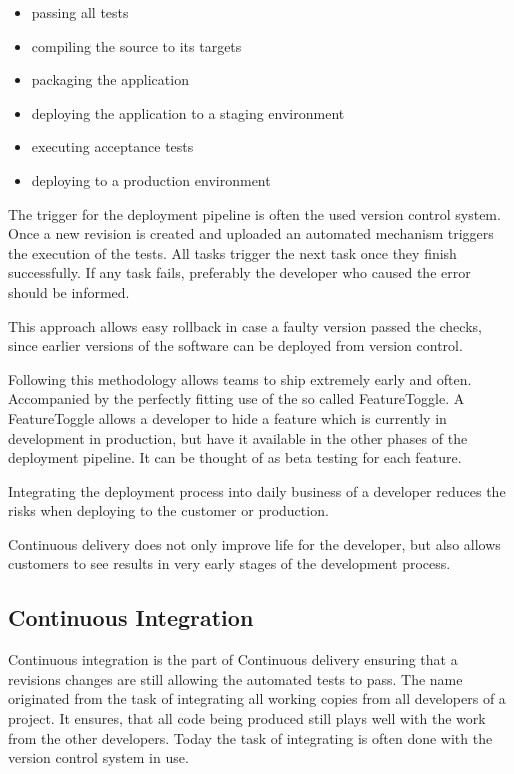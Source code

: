 \begin{itemize}
  \item{passing all tests}
  \item{compiling the source to its targets}
  \item{packaging the application}
  \item{deploying the application to a staging environment}
  \item{executing acceptance tests}
  \item{deploying to a production environment}
\end{itemize}

The trigger for the deployment pipeline is often the used version control
system. Once a new revision is created and uploaded an automated mechanism
triggers the execution of the tests. All tasks trigger the next task once they
finish successfully. If any task fails, preferably the developer who caused the
error should be informed.

This approach allows easy rollback in case a faulty version passed the checks,
since earlier versions of the software can be deployed from version control.

Following this methodology allows teams to ship extremely early and often.
Accompanied by the perfectly fitting use of the so called FeatureToggle. A
FeatureToggle allows a developer to hide a feature which is currently in
development in production, but have it available in the other phases of the
deployment pipeline. It can be thought of as beta testing for each feature.

Integrating the deployment process into daily business of a developer reduces
the risks when deploying to the customer or production.

Continuous delivery does not only improve life for the developer, but also
allows customers to see results in very early stages of the development
process.

\subsection{Continuous Integration}

Continuous integration is the part of Continuous delivery ensuring that a
revisions changes are still allowing the automated tests to pass. The name
originated from the task of integrating all working copies from all developers
of a project. It ensures, that all code being produced still plays well with
the work from the other developers. Today the task of integrating is often done
with the version control system in use.

